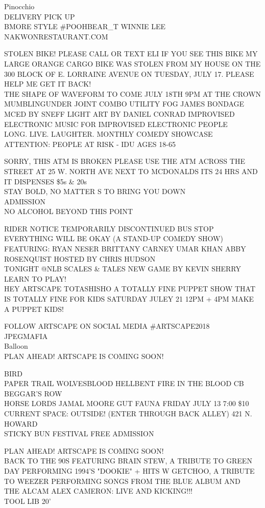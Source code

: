 \documentclass[10pt,letterpaper]{article}
\begin{document}
Pinocchio\\
DELIVERY PICK UP\\
BMORE STYLE \#POOHBEAR\_T WINNIE LEE\\
NAKWONRESTAURANT.COM

STOLEN BIKE!  PLEASE CALL OR TEXT ELI IF YOU SEE THIS BIKE MY LARGE ORANGE CARGO BIKE WAS STOLEN FROM MY HOUSE ON THE 300 BLOCK OF E. LORRAINE AVENUE ON TUESDAY, JULY 17.  PLEASE HELP ME GET IT BACK!\\
THE SHAPE OF WAVEFORM TO COME JULY 18TH 9PM AT THE CROWN MUMBLINGUNDER JOINT COMBO UTILITY FOG JAMES BONDAGE MCED BY SNEFF LIGHT ART BY DANIEL CONRAD IMPROVISED ELECTRONIC MUSIC FOR IMPROVISED ELECTRONIC PEOPLE\\
LONG. LIVE. LAUGHTER.  MONTHLY COMEDY SHOWCASE\\
ATTENTION: PEOPLE AT RISK {-} IDU AGES 18{-}65

SORRY, THIS ATM IS BROKEN PLEASE USE THE ATM ACROSS THE STREET AT 25 W. NORTH AVE NEXT TO MCDONALDS ITS 24 HRS AND IT DISPENSES \$5s \& 20s\\
STAY BOLD, NO MATTER S TO BRING YOU DOWN\\
ADMISSION\\
NO ALCOHOL BEYOND THIS POINT

RIDER NOTICE TEMPORARILY DISCONTINUED BUS STOP\\
EVERYTHING WILL BE OKAY (A STAND{-}UP COMEDY SHOW) FEATURING: RYAN NESER BRITTANY CARNEY UMAR KHAN ABBY ROSENQUIST HOSTED BY CHRIS HUDSON\\
TONIGHT @NLB SCALES \& TALES NEW GAME BY KEVIN SHERRY LEARN TO PLAY!\\
HEY ARTSCAPE TOTASHISHO A TOTALLY FINE PUPPET SHOW THAT IS TOTALLY FINE FOR KIDS SATURDAY JULEY 21 12PM + 4PM MAKE A PUPPET KIDS!

FOLLOW ARTSCAPE ON SOCIAL MEDIA \#ARTSCAPE2018\\
JPEGMAFIA\\
Balloon\\
PLAN AHEAD!  ARTSCAPE IS COMING SOON!

BIRD\\
PAPER TRAIL WOLVESBLOOD HELLBENT FIRE IN THE BLOOD CB BEGGAR'S ROW\\
HORSE LORDS JAMAL MOORE GUT FAUNA FRIDAY JULY 13 7:00 \$10 CURRENT SPACE: OUTSIDE! (ENTER THROUGH BACK ALLEY) 421 N. HOWARD\\
STICKY BUN FESTIVAL FREE ADMISSION

PLAN AHEAD!  ARTSCAPE IS COMING SOON!\\
BACK TO THE 90S FEATURING BRAIN STEW, A TRIBUTE TO GREEN DAY PERFORMING 1994'S "DOOKIE" + HITS W GETCHOO, A TRIBUTE TO WEEZER PERFORMING SONGS FROM THE BLUE ALBUM AND\\
THE ALCAM ALEX CAMERON: LIVE AND KICKING!!!\\
TOOL LIB 20'
\end{document}
